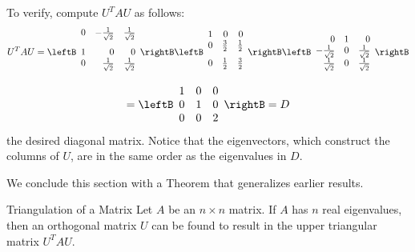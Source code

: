 \begin{solution}
To verify, compute $U^{T}AU$ as follows:
\begin{equation*}
U^{T}AU = 
\leftB
\begin{array}{rrr}
0 & -\vspace{0.05in}\frac{1}{\sqrt{2}} & \vspace{0.05in}\frac{1}{\sqrt{2}}
\\ 
1 & 0 & 0 \\ 
0 & \vspace{0.05in}\frac{1}{\sqrt{2}} & \vspace{0.05in}\frac{1}{\sqrt{2}}
\end{array}
\rightB \leftB
\begin{array}{rrr}
1 & 0 & 0 \\ 
0 & \vspace{0.05in}\frac{3}{2} & \vspace{0.05in}\frac{1}{2} \\ 
0 & \vspace{0.05in}\frac{1}{2} & \vspace{0.05in}\frac{3}{2}
\end{array}
\rightB \leftB 
\begin{array}{rrr}
0 & 1 & 0 \\ 
-\frac{1}{\sqrt{2}} & 0 & \frac{1}{\sqrt{2}} \\ 
\frac{1}{\sqrt{2}} & 0 & \frac{1}{\sqrt{2}}
\end{array}
\rightB
\end{equation*}
\begin{equation*}
=\leftB
\begin{array}{rrr}
1 & 0 & 0 \\ 
0 & 1 & 0 \\ 
0 & 0 & 2
\end{array}
\rightB = D 
\end{equation*}
the desired diagonal matrix. Notice that the eigenvectors, which construct the columns of $U$, are in the same order as the eigenvalues in $D$. 
\end{solution}

We conclude this section with a Theorem that generalizes earlier results.

\begin{theorem}{Triangulation of a Matrix}\label{thm:triangulation}
Let $A$ be an $n \times n$ matrix. If $A$ has $n$ real eigenvalues, then an orthogonal matrix $U$ can be found to result in the upper triangular matrix $U^T A U$. 
\end{theorem}

